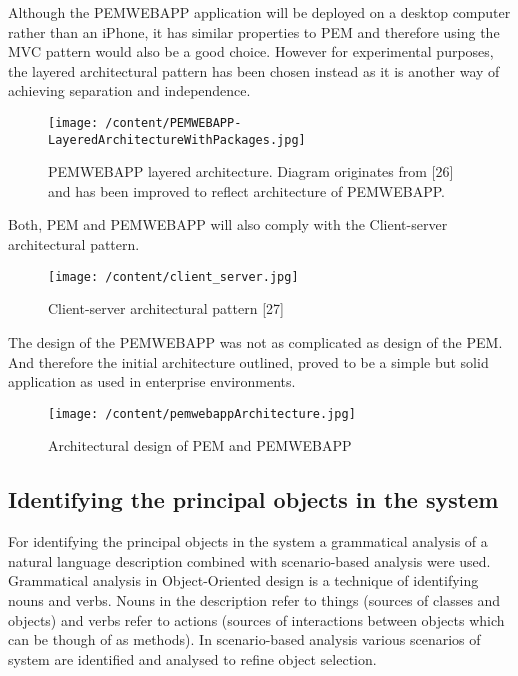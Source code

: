 \documentclass[12pt, a4paper]{report}   %
\begin{document}
\begin{enumerate}
Although the PEMWEBAPP application will be deployed on a desktop computer rather than an iPhone, it has similar properties to PEM and therefore using the MVC pattern would also be a good choice. However for experimental purposes, the layered architectural pattern has been chosen instead as it is another way of achieving separation and independence.\\


\begin{figure}[H]
  \centering
	\texttt{[image: /content/PEMWEBAPP-LayeredArchitectureWithPackages.jpg]}
	  \caption{PEMWEBAPP layered architecture. Diagram originates from [26] and has been improved to reflect architecture of PEMWEBAPP.}
\end{figure}
 

Both, PEM and PEMWEBAPP will also comply with the Client-server architectural pattern. \\
 
 
\begin{figure}[H]
  \centering
	\texttt{[image: /content/client\_server.jpg]}
	  \caption{Client-server architectural pattern [27]}
\end{figure}
 
 
The design of the PEMWEBAPP was not as complicated as design of the PEM. And therefore the initial architecture outlined, proved to be a simple but solid application as used in enterprise environments.


\begin{figure}[H]
\begin{sideways}
\begin{minipage}{19cm}
	\texttt{[image: /content/pemwebappArchitecture.jpg]}
	\caption{Architectural design of PEM and PEMWEBAPP}
\end{minipage}
\end{sideways}
\centering
\end{figure}
 

\clearpage
\subsection{Identifying the principal objects in the system}
For identifying the principal objects in the system a grammatical analysis of a natural language description combined with scenario-based analysis were used. Grammatical analysis in Object-Oriented design is a technique of identifying nouns and verbs. Nouns in the description refer to things (sources of classes and objects) and verbs refer to actions (sources of interactions between objects which can be though of as methods). In scenario-based analysis various scenarios of system are identified and analysed to refine object selection.\\ \\



\end{enumerate}
\end{document}

